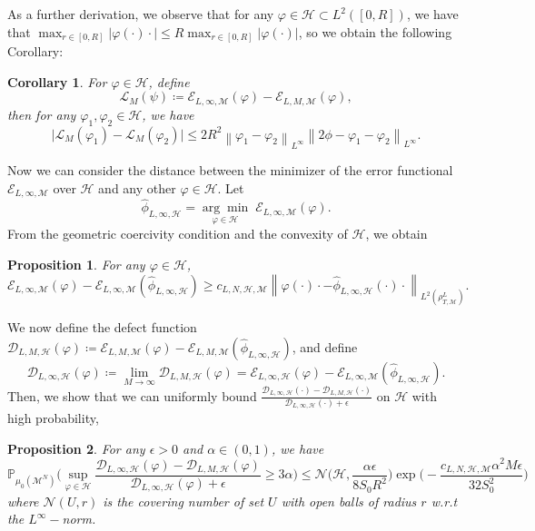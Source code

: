 \documentclass[11pt]{article}
\newtheorem{corollary}[theorem]{Corollary}
\newcommand{\abs}[1]{\big| #1 \big|}
\newcommand{\norm}[1]{\left\| #1 \right\|}
\newcommand{\mD}{\mathcal{D}}
\newcommand{\mE}{\mathcal{E}}
\newcommand{\mH}{\mathcal{H}}
\newcommand{\mM}{\mathcal{M}}
\newcommand{\mN}{\mathcal{N}}
\newcommand{\intkernel}{\phi}
\newcommand{\lintkernel}{\widehat{\intkernel}}
\newcommand{\intkernelvar}{\varphi}
\newcommand{\probIC}{\mu_0}
\newcommand{\muX}{\probIC(\mM^N)}
\newcommand{\argmin}[1]{\underset{#1}{\operatorname{arg}\operatorname{min}}\;}
\newtheorem{prop}{Proposition}
\begin{document}
As a further derivation, we observe that for any $\intkernelvar \in \mH \subset L^2([0,R])$, we have that $\max_{r \in [0, R]}\abs{\intkernelvar(\cdot)\cdot} \le R\max_{r \in [0, R]}\abs{\intkernelvar(\cdot)}$, so we obtain the following Corollary:
\begin{corollary}\label{coro1}
For $\intkernelvar \in \mH$, define
\[
\mathcal{L}_M(\psi) \coloneqq \mE_{L, \infty, \mM}(\intkernelvar) - \mE_{L, M, \mM}(\intkernelvar),
\]
then for any $\intkernelvar_1, \intkernelvar_2 \in \mH$, we have
\[
\abs{\mathcal{L}_M(\intkernelvar_1) - \mathcal{L}_M(\intkernelvar_2)} \leq 2R^2\norm{\intkernelvar_1 - \intkernelvar_2}_{L^\infty}\norm{2\intkernel - \intkernelvar_1 - \intkernelvar_2}_{L^\infty}.
\]
\end{corollary}
Now we can consider the distance between the minimizer of the error functional $\mE_{L,\infty, \mM}$ over $\mH$ and any other $\intkernelvar \in \mH$.  Let 
\[
\lintkernel_{L,\infty,\mH} = \argmin{\intkernelvar \in \mathcal{H}} \mE_{L,\infty, \mM}(\intkernelvar).
\]
From the geometric coercivity condition and the convexity of $\mH$, we obtain
\begin{prop}\label{uniqueness}
For any $\intkernelvar \in \mH$, 
\begin{equation}\label{uniqueness inequality}
\mE_{L,\infty, \mM}(\intkernelvar) - \mE_{L,\infty, \mM}(\lintkernel_{L,\infty,\mH}) \geq c_{L, N, \mH, \mM}\norm{\intkernelvar(\cdot)\cdot - \lintkernel_{L,\infty,\mH}(\cdot)\cdot}_{L^2(\rho_{T, \mM}^L)}.
\end{equation}
\end{prop}			
We now define the defect function $\mD_{L,M,\mH}(\intkernelvar) \coloneqq \mE_{L,M, \mM}(\intkernelvar) - \mathcal{E}_{L, M, \mM}(\lintkernel_{L,\infty,\mH})$, and define
\[
\mD_{L,\infty,\mH}(\intkernelvar) \coloneqq \lim\limits_{M \to \infty} \mD_{L,M, \mH}(\intkernelvar) = \mE_{L, \infty, \mH}(\intkernelvar) - \mE_{L, \infty, \mM}(\lintkernel_{L,\infty,\mH}).
\]
Then, we show that we can uniformly bound $\frac{\mD_{L, \infty, \mH}(\cdot) - \mD_{L, M, \mH}(\cdot)}{\mD_{L, \infty, \mH}(\cdot) + \epsilon}$ on $\mH$ with high probability,
\begin{prop}\label{uniform bound}
For any $\epsilon > 0$ and $\alpha \in (0,1)$, we have
\[
\mathbb{P}_{\muX} \bigg(\sup\limits_{\intkernelvar \in \mH} \frac{\mD_{L, \infty, \mH}(\intkernelvar) - \mD_{L, M, \mH}(\intkernelvar)}{\mD_{L,\infty,\mH}(\intkernelvar) + \epsilon} \geq 3\alpha \bigg) \leq \mN\Big(\mathcal{H}, \frac{\alpha\epsilon}{8S_0R^2}\Big)\exp\bigg(-\frac{c_{L,N,\mH, \mM}\alpha^2M\epsilon}{32S_0^2}\bigg)
\]
where $\mN(U, r)$ is the covering number of set $U$ with open balls of radius $r$ w.r.t the $L^\infty-$norm.
\end{prop}
\end{document}
